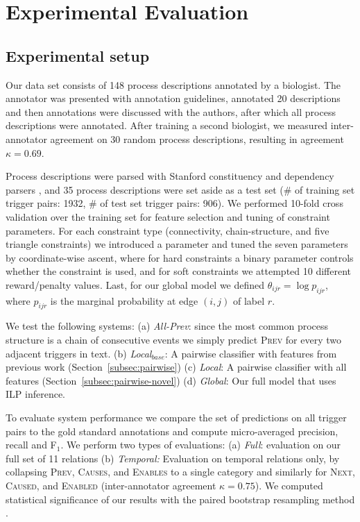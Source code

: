 \section{Experimental Evaluation}

\subsection{Experimental setup} \label{subsec:setup}

Our data set consists of 148 process descriptions annotated by a biologist. The annotator was presented with annotation guidelines, annotated 20 descriptions and then annotations were discussed with the authors, after which all process descriptions were annotated. After training a second biologist, we measured inter-annotator agreement on 30 random process descriptions, resulting in agreement $\kappa=0.69$. 

Process descriptions were parsed with Stanford constituency and dependency parsers \cite{Klein03,Marneffe06}, and 35 process descriptions were set aside as a test set (\# of training set trigger pairs: 1932, \# of test set trigger pairs: 906). We performed 10-fold cross validation over the training set for feature selection and tuning of constraint parameters. For each constraint type (connectivity, chain-structure, and five triangle constraints) we introduced a parameter and tuned the seven parameters by coordinate-wise ascent, where for hard constraints a binary parameter controls whether the constraint is used, and for soft constraints we attempted 10 different reward/penalty values. Last, for our global model we defined $\theta_{ijr}=\log p_{ijr}$, where $p_{ijr}$ is the marginal probability at edge $(i,j)$ of label $r$.


We test the following systems: (a) \emph{All-Prev}: since the most common process structure is a chain of consecutive events we simply predict \textsc{Prev} for every two adjacent triggers in text. (b) \emph{Local$_{base}$}: A pairwise classifier with features from previous work (Section~\ref{subsec:pairwise}) (c) \emph{Local}: A pairwise classifier with all features (Section~\ref{subsec:pairwise-novel}) (d) \emph{Global}: Our full model that uses ILP inference.


To evaluate system performance we compare the set of predictions on all trigger pairs to the gold standard annotations and compute micro-averaged precision, recall and F$_1$. We perform two types of evaluations: (a) \emph{Full}: evaluation on our full set of 11 relations (b) \emph{Temporal:} Evaluation on temporal relations only, by collapsing \textsc{Prev}, \textsc{Causes}, and \textsc{Enables} to a single category and similarly for \textsc{Next}, \textsc{Caused}, and \textsc{Enabled} (inter-annotator agreement $\kappa=0.75$). We computed statistical significance of our results with the paired bootstrap resampling method \cite{efron1993}.

